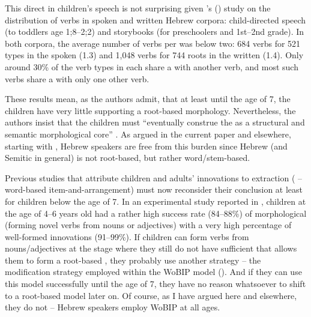 \documentclass[output=paper,
modfonts
]{LSP/langsci}
\begin{document}
This direct  in children's speech is not surprising given
\citeauthor{ravid2016a}'s (\citeyear{ravid2016a}) study on the distribution of verbs in spoken and
written Hebrew corpora: child-directed speech (to toddlers age 1;8--2;2)
and storybooks (for preschoolers and
1st--2nd grade). In both corpora,
the average number of verbs per  was below two: 684 verbs for 521
 types in the spoken  (1.3) and 1,048 verbs for 744 roots in
the written  (1.4). Only around 30\% of the verb types in each
 share a  with another verb, and most such verbs share a 
with only one other verb.

These results mean, as the authors admit, that at least until the age of
7, the children have very little  supporting a root-based
morphology. Nevertheless, the authors insist that the children must
``eventually construe the  as a structural and semantic
morphological core'' \citep[126]{ravid2016a}. As argued in the current
paper and elsewhere, starting with \citet{Batel1994}, Hebrew speakers are
free from this burden since Hebrew  (and Semitic  in
general) is not root-based, but rather word/stem-based.

Previous studies that attribute children and adults' innovations to 
extraction ( -- word-based item-and-arrangement) must now reconsider
their conclusion at least for children below the age of 7. In an
experimental study reported in \citet{berman2003a}, children at the age of
4--6 years old had a rather high success rate (84--88\%) of morphological
 (forming novel verbs from nouns or adjectives) with a very
high percentage of well-formed innovations (91--99\%). If children can
form verbs from nouns/adjectives at the stage where they still do not
have sufficient  that allows them to form a root-based 
\citep{ravid2016a}, they probably use another strategy -- the
modification strategy employed within the WoBIP model (). And if
they can use this model successfully until the age of 7, they have no
reason whatsoever to shift to a root-based model later on. Of course, as
I have argued here and elsewhere, they do not -- Hebrew speakers employ
WoBIP at all ages.
\end{document}
